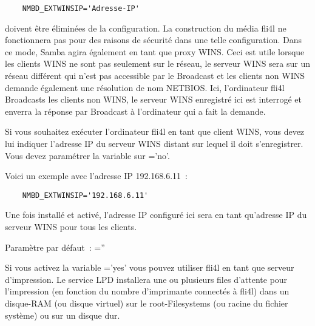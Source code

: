 \begin{description}
\begin{example}
\begin{verbatim}
    NMBD_EXTWINSIP='Adresse-IP'
\end{verbatim}
\end{example}

    doivent être éliminées de la configuration. La construction du média fli4l
    ne fonctionnera pas pour des raisons de sécurité dans une telle configuration.
    Dans ce mode, Samba agira également en tant que proxy WINS. Ceci est utile
    lorsque les clients WINS ne sont pas seulement sur le réseau, le serveur WINS
    sera sur un réseau différent qui n'est pas accessible par le Broadcast et
    les clients non WINS demande également une résolution de nom NETBIOS. Ici,
    l'ordinateur fli4l Broadcasts les clients non WINS, le serveur WINS enregistré
    ici est interrogé et enverra la réponse par Broadcast à l'ordinateur qui a
    fait la demande.

    Si vous souhaitez exécuter l'ordinateur fli4l en tant que client WINS, vous
    devez lui indiquer l'adresse IP du serveur WINS distant sur lequel il doit
    s'enregistrer. Vous devez paramétrer la variable sur ='no'.

    Voici un exemple avec l'adresse IP 192.168.6.11~:

\begin{example}
\begin{verbatim}
    NMBD_EXTWINSIP='192.168.6.11'
\end{verbatim}
\end{example}

    Une fois  installé et activé, l'adresse IP configuré ici
    sera en tant qu'adresse IP du serveur WINS pour tous les clients.

    Paramètre par défaut~: =''

\end{description}



    Si vous activez la variable ='yes' vous pouvez utiliser fli4l
    en tant que serveur d'impression. Le service LPD installera une ou plusieurs
    files d'attente pour l'impression (en fonction du nombre d'imprimante
    connectés à fli4l) dans un disque-RAM (ou disque virtuel) sur le
    root-Filesystems (ou racine du fichier système) ou sur un disque dur.

